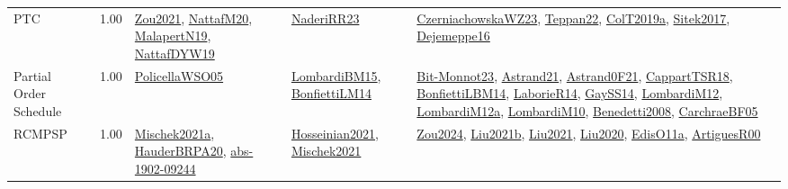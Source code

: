 {\begin{longtable}{p{3cm}r>{\raggedright\arraybackslash}p{6cm}>{\raggedright\arraybackslash}p{6cm}>{\raggedright\arraybackslash}p{8cm}}
\index{PTC}\index{Classification!PTC}PTC &  1.00 & \hyperref[detail:Zou2021]{Zou2021}, \hyperref[detail:NattafM20]{NattafM20}, \hyperref[detail:MalapertN19]{MalapertN19}, \hyperref[detail:NattafDYW19]{NattafDYW19} & \hyperref[detail:NaderiRR23]{NaderiRR23} & \hyperref[detail:CzerniachowskaWZ23]{CzerniachowskaWZ23}, \hyperref[detail:Teppan22]{Teppan22}, \hyperref[detail:ColT2019a]{ColT2019a}, \hyperref[detail:Sitek2017]{Sitek2017}, \hyperref[detail:Dejemeppe16]{Dejemeppe16}\\
\index{Partial Order Schedule}\index{Classification!Partial Order Schedule}Partial Order Schedule &  1.00 & \hyperref[detail:PolicellaWSO05]{PolicellaWSO05} & \hyperref[detail:LombardiBM15]{LombardiBM15}, \hyperref[detail:BonfiettiLM14]{BonfiettiLM14} & \hyperref[detail:Bit-Monnot23]{Bit-Monnot23}, \hyperref[detail:Astrand21]{Astrand21}, \hyperref[detail:Astrand0F21]{Astrand0F21}, \hyperref[detail:CappartTSR18]{CappartTSR18}, \hyperref[detail:BonfiettiLBM14]{BonfiettiLBM14}, \hyperref[detail:LaborieR14]{LaborieR14}, \hyperref[detail:GaySS14]{GaySS14}, \hyperref[detail:LombardiM12]{LombardiM12}, \hyperref[detail:LombardiM12a]{LombardiM12a}, \hyperref[detail:LombardiM10]{LombardiM10}, \hyperref[detail:Benedetti2008]{Benedetti2008}, \hyperref[detail:CarchraeBF05]{CarchraeBF05}\\
\index{RCMPSP}\index{Classification!RCMPSP}RCMPSP &  1.00 & \hyperref[detail:Mischek2021a]{Mischek2021a}, \hyperref[detail:HauderBRPA20]{HauderBRPA20}, \hyperref[detail:abs-1902-09244]{abs-1902-09244} & \hyperref[detail:Hosseinian2021]{Hosseinian2021}, \hyperref[detail:Mischek2021]{Mischek2021} & \hyperref[detail:Zou2024]{Zou2024}, \hyperref[detail:Liu2021b]{Liu2021b}, \hyperref[detail:Liu2021]{Liu2021}, \hyperref[detail:Liu2020]{Liu2020}, \hyperref[detail:EdisO11a]{EdisO11a}, \hyperref[detail:ArtiguesR00]{ArtiguesR00}\\

\end{longtable}}
